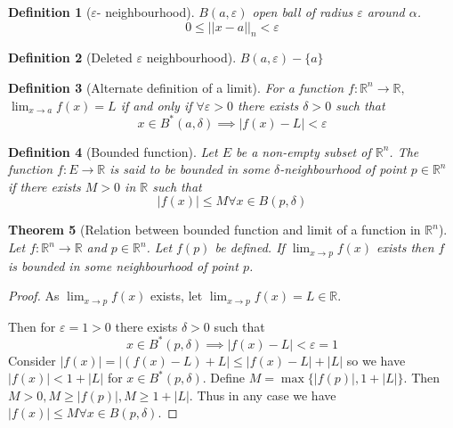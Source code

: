 \documentclass[oneside,11pt,pdftex]{book}%
\numberwithin{equation}{section}
\newtheorem{theorem}{Theorem}[chapter]%
\newtheorem{definition}[theorem]{Definition}
\numberwithin{section}{chapter}
\numberwithin{equation}{chapter}
\newcommand{\R}{\mathbb{R}}
\begin{document}
\begin{definition}[$ \varepsilon $- neighbourhood]
	$ B(a,\varepsilon) $ open ball of radius $ \varepsilon $ around $ \alpha $.
	\[ 0 \leq ||x-a||_n < \varepsilon \]
\end{definition}
\begin{definition}[Deleted $ \varepsilon $ neighbourhood]
	$ B(a,\varepsilon)-\{a\} $
\end{definition}

\begin{definition}[Alternate definition of a limit]
	For a function $ f:\R^n \rightarrow \R,$ $ \lim_{x\rightarrow a }f(x)=L$ if and only if $ \forall \varepsilon>0 $ there exists $ \delta>0 $ such that \[ x \in B^*(a,\delta)\implies |f(x)-L|<\varepsilon \]
\end{definition}

\begin{definition}[Bounded function]
	Let $ E $ be a non-empty subset of $ \R^n $. The function $ f:E\rightarrow \R  $ is said to be bounded in some $ \delta  $-neighbourhood of point $ p\in \R^n $ if there exists $ M>0 $ in $ \R  $ such that \[ |f(x)| \leq M \forall x \in B(p, \delta) \]
\end{definition}

\begin{theorem}[Relation between bounded function and limit of a function in $ \R^n $]\label{bounded}
	Let $ f:\R^n \rightarrow \R $ and $ p \in \R^n $. Let $ f(p) $ be defined. If $  \lim_{x\rightarrow p}f(x)  $ exists then $ f $ is bounded in some neighbourhood of point $ p $.
\end{theorem}
\begin{proof}
	As $ \lim_{x\rightarrow p}f(x) $ exists, let $ \lim_{x\rightarrow  p} f(x)=L \in \R $.
	
	Then for $ \varepsilon=1>0 $ there exists $ \delta>0 $ such that \[ x \in B^*(p,\delta ) \implies |f(x)-L|<\varepsilon=1\]
	Consider $ |f(x)|=|(f(x)-L)+L|\leq |f(x)-L|+|L| $ so we have $ |f(x)|<1+|L| $ for $ x\in B^*(p,\delta) $. Define $ M=\max\{|f(p)|,1+|L|\} $. Then $ M>0, M\geq |f(p)|, M\geq 1+|L|$. Thus in any case we have $ |f(x)|\leq M \forall x \in B(p,\delta) $.
\end{proof}
\end{document}
